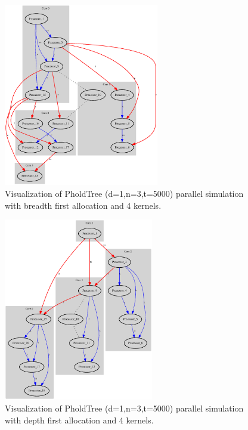 \begin{figure}
	\center
	\includegraphics[width=\plotfraction\columnwidth,  height=8cm, keepaspectratio]{fig/pholdtreed1n3t5000c4BFS.eps}
	\caption{Visualization of PholdTree (d=1,n=3,t=5000) parallel simulation with breadth first allocation and 4 kernels.}
	\label{fig:pholdtree_visualize_parBFS}
\end{figure}
\begin{figure}
	\center
	\includegraphics[width=\plotfraction\columnwidth,  height=8cm, keepaspectratio]{fig/pholdtreed1n3t5000c4DFS.eps}
	\caption{Visualization of PholdTree (d=1,n=3,t=5000) parallel simulation with depth first allocation and 4 kernels.}
	\label{fig:pholdtree_visualize_parDFS}
\end{figure}